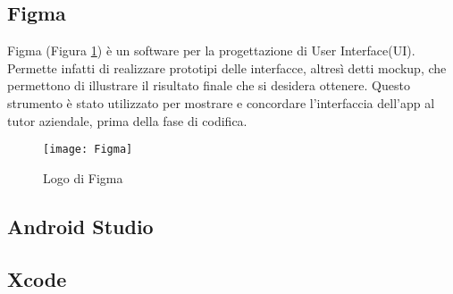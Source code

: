 \subsection{Figma}
Figma (Figura \ref{fig:figma}) è un software per la progettazione di User Interface(UI).\newline
Permette infatti di realizzare prototipi delle interfacce, altresì detti mockup, che permettono di illustrare il risultato finale che si desidera ottenere.\newline
Questo strumento è stato utilizzato per mostrare e concordare l'interfaccia dell'app al tutor aziendale, prima della fase di codifica.\newline
\begin{figure}[!h] 
    \centering 
    \texttt{[image: Figma]} 
    \caption{Logo di Figma}\label{fig:figma}
\end{figure}



\subsection{Android Studio}

\subsection{Xcode}

